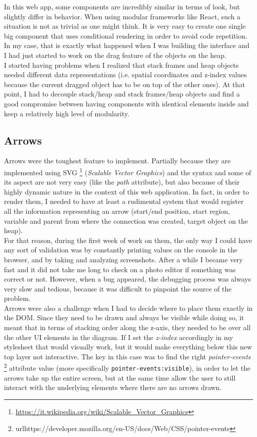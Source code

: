 \documentclass[]{usiinfbachelorproject}
\begin{document}
In this web app, some components are incredibly similar in terms of look, but slightly differ in behavior. When using modular frameworks like React, such a situation is not as trivial as one might think. It is very easy to create one single big component that uses conditional rendering in order to avoid code repetition. In my case, that is exactly what happened when I was building the interface and I had just started to work on the drag feature of the objects on the heap.\\ I started having problems when I realized that stack frames and heap objects needed different data representations (i.e. spatial coordinates and z-index values because the current dragged object has to be on top of the other ones). At that point, I had to decouple stack/heap and stack frames/heap objects and find a good compromise between having components with identical elements inside and keep a relatively high level of modularity.

\subsection{Arrows}

Arrows were the toughest feature to implement. Partially because they are implemented using SVG \footnote{\url{https://it.wikipedia.org/wiki/Scalable_Vector_Graphics}} (\emph{Scalable Vector Graphics}) and the syntax and some of its aspect are not very easy (like the \emph{path} attribute), but also because of their highly dynamic nature in the context of this web application. In fact, in order to render them, I needed to have at least a rudimental system that would register all the information representing an arrow (start/end position, start region, variable and parent from where the connection was created, target object on the heap).\\For that reason, during the first week of work on them, the only way I could have any sort of validation was by constantly printing values on the console in the browser, and by taking and analyzing screenshots. After a while I became very fast and it did not take me long to check on a photo editor if something was correct or not. However, when a bug appeared, the debugging process was always very slow and tedious, because it was difficult to pinpoint the source of the problem.\\

\noindent Arrows were also a challenge when I had to decide where to place them exactly in the DOM. Since they need to be drawn and always be visible while doing so, it meant that in terms of stacking order along the z-axis, they needed to be over all the other UI elements in the diagram. If I set the \emph{z-index} accordingly in my stylesheet that would visually work, but it would make everything below this new top layer not interactive. The key in this case was to find the right \emph{pointer-events} \footnote{url{https://developer.mozilla.org/en-US/docs/Web/CSS/pointer-events}} attribute value (more specifically \texttt{pointer-events:visible}), in order to let the arrows take up the entire screen, but at the same time allow the user to still interact with the underlying elements where there are no arrows drawn.\\
\end{document}
